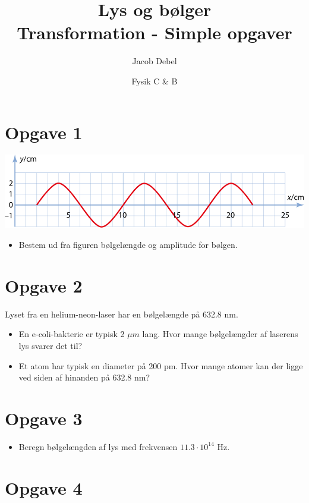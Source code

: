 \documentclass[a4paper, 12pt]{article}
\author{Jacob Debel}
\date{Fysik C \& B}
\title{Lys og bølger\\\medskip
\large Transformation - Simple opgaver}
\begin{document}
\maketitle


\section*{Opgave 1}
\label{sec:orgf9bd3b4}
\begin{center}
\includegraphics[width=.9\linewidth]{./img/boelge_opgave.png}
\end{center}

\begin{itemize}
\item Bestem ud fra figuren bølgelængde og amplitude for bølgen.
\end{itemize}

\section*{Opgave 2}
\label{sec:orgeb84499}

Lyset fra en helium-neon-laser har en bølgelængde på 632.8 nm.

\begin{itemize}
\item En e-coli-bakterie er typisk 2 \(\mu m\) lang. Hvor mange bølgelængder af laserens lys svarer det til?

\item Et atom har typisk en diameter på 200 pm. Hvor mange atomer kan der ligge ved siden af hinanden på 632.8 nm?
\end{itemize}

\section*{Opgave 3}
\label{sec:orgd12311f}

\begin{itemize}
\item Beregn bølgelængden af lys med frekvensen \(11.3 \cdot 10^{14}\) Hz.
\end{itemize}

\section*{Opgave 4}
\label{sec:orgd8fae74}
\end{document}
